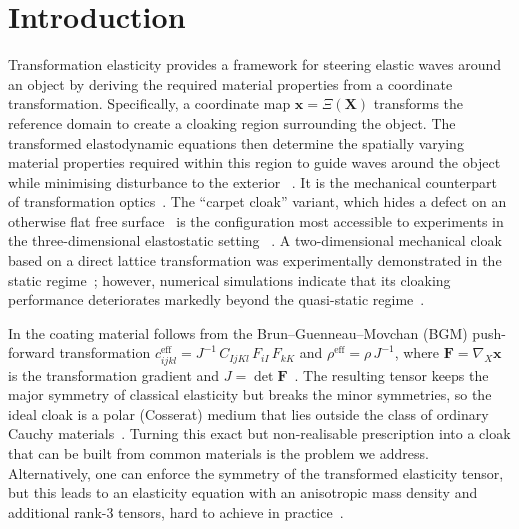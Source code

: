 \documentclass[preprint,12pt]{elsarticle}
\newcommand{\mbf}[1]{\mathbf{#1}}
\begin{document}
\section{Introduction}\label{sec:intro}

Transformation elasticity provides a framework for steering elastic waves around an object by deriving the required material properties from a coordinate transformation. Specifically, a coordinate map $\mbf{x}=\Xi(\mbf{X})$ transforms the reference domain to create a cloaking region surrounding the object. The transformed elastodynamic equations then determine the spatially varying material properties required within this region to guide waves around the object while minimising disturbance to the exterior ~\citep{milton2006,brun2009,norris2011,diatta2014controlling}. It is the mechanical counterpart of
transformation optics~\citep{pendry2006}. The ``carpet cloak'' variant, which
hides a defect on an otherwise flat free surface~\citep{li2008} is the
configuration most accessible to experiments in the three-dimensional elastostatic setting ~\citep{buckmann2014elasto}. 
A two-dimensional mechanical cloak based on a direct lattice transformation was experimentally demonstrated in the static regime~\citep{buckmann2015}; however, numerical simulations indicate that its cloaking performance deteriorates markedly beyond the quasi-static regime~\citep{kadic2020elastodynamic}.


In \citep{brun2009,diatta2014controlling} the coating material follows from the Brun--Guenneau--Movchan (BGM)
push-forward transformation 
$c^{\mathrm{eff}}_{ijkl}=J^{-1}\,C_{IjKl}\,F_{iI}\,F_{kK}$ and
$\rho^{\mathrm{eff}}=\rho\,J^{-1}$, where $\mbf{F}=\nabla_{\!X}\mbf{x}$
is the transformation gradient and $J=\det\mbf{F}$~\citep{brun2009,norris2011}.
The resulting tensor keeps the major symmetry of classical elasticity but
breaks the minor symmetries, so the ideal cloak is a polar (Cosserat)
medium that lies outside the class of ordinary Cauchy
materials~\citep{milton1995,milton2006}. Turning this exact but
non-realisable prescription into a cloak that can be built from common
materials is the problem we address. Alternatively, one can enforce the symmetry of the transformed elasticity tensor, but this leads to an elasticity equation with an anisotropic mass density and additional rank-3 tensors, hard to achieve in practice~\citep{milton2006,norris2011}.
\end{document}
